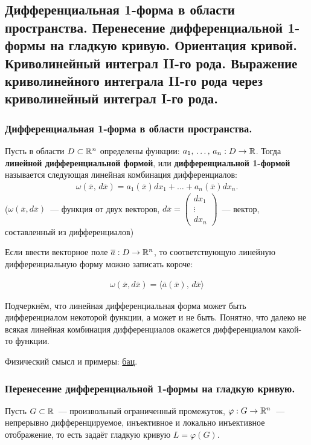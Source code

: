 \subsection{Дифференциальная 1-форма в области пространства. Перенесение дифференциальной 1-формы на гладкую кривую. Ориентация кривой. Криволинейный интеграл II-го рода. Выражение криволинейного интеграла II-го рода через криволинейный интеграл I-го рода.}

\subsubsection{Дифференциальная 1-форма в области пространства.}
\begin{definition*}
    Пусть в области $D \subset \mathbb{R}^n$ определены функции: $a_1,\, \ldots,\, a_n : D \to \mathbb{R}$. Тогда \textbf{линейной дифференциальной формой}, или \textbf{дифференциальной 1-формой} называется следующая линейная комбинация дифференциалов:
    \begin{align*}
        \omega (\overline{x},\, d\overline{x}) = a_1(\overline{x})dx_1 + \ldots + a_n(\overline{x})dx_n.
    \end{align*} 
    ($\omega(\overline{x}, d\overline{x})$~--- функция от двух векторов, $d\overline{x} = \begin{pmatrix}
        dx_1 \\
        \vdots \\
        dx_n
    \end{pmatrix}$~--- вектор, составленный из дифференциалов)
\end{definition*}

Если ввести векторное поле $\overline{a}: D \to \mathbb{R}^n$, то соответствующую линейную дифференциальную форму можно записать короче:

\begin{align*}
    \omega (\overline{x}, d\overline{x}) = \langle \overline{a}(\overline{x}),\, d\overline{x} \rangle
\end{align*}

Подчеркнём, что линейная дифференциальная форма может быть дифференциалом некоторой функции, а может и не быть. Понятно, что далеко не всякая линейная комбинация дифференциалов окажется дифференциалом какой-то функции.

Физический смысл и примеры: \href{https://youtu.be/WS-N2Dka3xU?list=PLEwK9wdS5g0qV-430pfXzTawd6pI_VUgq&t=912}{бац}.

\subsubsection{Перенесение дифференциальной 1-формы на гладкую кривую.}
Пусть $G \subset \mathbb{R}$~--- произвольный ограниченный промежуток, $\varphi : G \to \mathbb{R}^n$~--- непрерывно дифференцируемое, инъективное и локально инъективное отображение, то есть задаёт гладкую кривую $L = \varphi(G)$.

